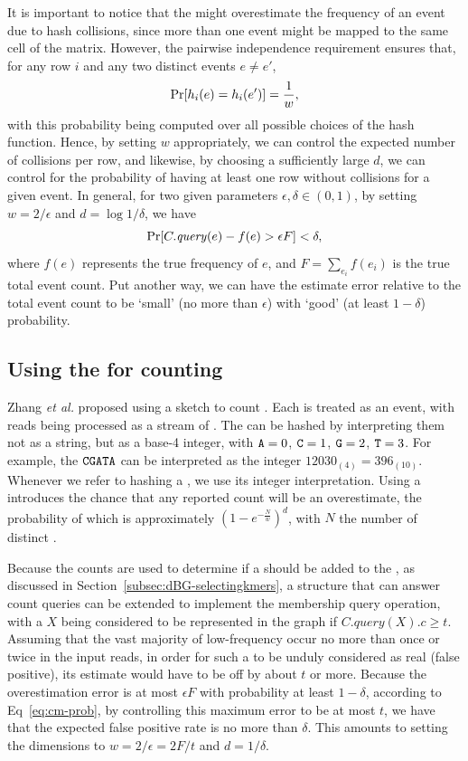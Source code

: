 It is important to notice that the \cm might overestimate the frequency of an event due to hash collisions, since more than one event might be mapped to the same cell of the matrix. However, the pairwise independence requirement ensures that, for any row $i$ and any two distinct events $e\neq e'$,
\begin{equation*}
\mathrm{Pr}[h_i(e)=h_i(e')] = \frac{1}{w},
\end{equation*}
with this probability being computed over all possible choices of the hash function.
Hence, by setting $w$ appropriately, we can control the expected number of collisions per row, and likewise, by choosing a sufficiently large $d$, we can control for the probability of having at least one row without collisions for a given event. In general, for two given parameters $\epsilon, \delta \in (0,1)$, by setting 
$w=2/\epsilon$ and $d=\log1/\delta$, we have
\begin{equation}
\label{eq:cm-prob}
\mathrm{Pr}[C.\mathit{query}(e) - f(e) > \epsilon F] < \delta,
\end{equation}
where $f(e)$ represents the true frequency of $e$, and $F=\sum_{e_i}f(e_i)$ is the true total event count. Put another way, we can have the estimate error relative to the total event count to be `small' (no more than $\epsilon$) with `good' (at least $1-\delta$) probability.

\subsection{Using the \cm for counting }
\label{subsec:cm-countingkmers}

Zhang \emph{et al.} proposed using a \cm sketch to count  \cite{Zhang2014}. Each \kmer is treated as an event, with reads being processed as a stream of . The  can be hashed by interpreting them not as a string, but as a base-4 integer, with $\mathtt{A}=0$, $\mathtt{C}=1$, $\mathtt{G}=2$, $\mathtt{T}=3$. For example, the \kmer $\mathtt{C}\mathtt{G}\mathtt{A}\mathtt{T}\mathtt{A}$ can be interpreted as the integer $12030_{(4)} = 396_{(10)}$. Whenever we refer to hashing a \kmer, we use its integer interpretation. Using a \cm introduces the chance that any reported count will be an overestimate, the probability of which is approximately $(1-e^{-\frac{N}{w}})^d$, with $N$ the number of distinct  \cite{Zhang2014}.


Because the \kmer counts are used to determine if a \kmer should be added to the \dBG, as discussed in Section~\ref{subsec:dBG-selectingkmers}, a structure that can answer count queries can be extended to implement the membership query operation, with a \kmer $X$ being considered to be represented in the graph if $C.\mathit{query}(X).c \geq t$. 
Assuming that the vast majority of low-frequency \kmers occur no more than once or twice in the input reads, in order for such a \kmer to be unduly considered as real (false positive), its \cm estimate would have to be off by about $t$ or more. Because the \cm overestimation error is at most $\epsilon F$ with probability at least $1-\delta$, according to Eq~\ref{eq:cm-prob}, by controlling this maximum error to be at most $t$, we have that the expected false positive rate is no more than $\delta$. This amounts to setting the \cm dimensions to $w=2/\epsilon = 2F/t$ and $d=1/\delta$.


